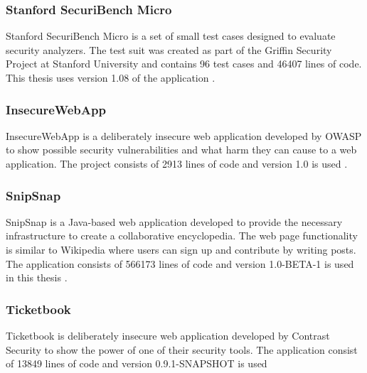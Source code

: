 \subsubsection{Stanford SecuriBench Micro}
Stanford SecuriBench Micro is a set of small test cases designed to evaluate security analyzers. The test suit was created as part of the Griffin Security Project \parencite{griffin} at Stanford University and contains 96 test cases and 46407 lines of code. This thesis uses version 1.08 of the application \parencite{securiBenchMicro, microfaq}. 



\subsubsection{InsecureWebApp}
InsecureWebApp is a deliberately insecure web application developed by OWASP to show possible security vulnerabilities and what harm they can cause to a web application. The project consists of 2913 lines of code and version 1.0 is used \parencite{insecure}. 



\subsubsection{SnipSnap}
SnipSnap is a Java-based web application developed to provide the necessary infrastructure to create a collaborative encyclopedia. The web page functionality is similar to Wikipedia \parencite{wikipedia} where users can sign up and contribute by writing posts. The application consists of 566173 lines of code and version 1.0-BETA-1 is used in this thesis \parencite{snipsnap}. 



\subsubsection{Ticketbook}
Ticketbook is deliberately insecure web application developed by Contrast Security to show the power of one of their security tools. The application consist of 13849 lines of code and version 0.9.1-SNAPSHOT is used \parencite{ticketbook, contrast}